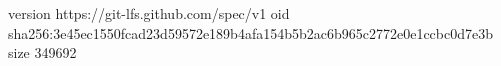 version https://git-lfs.github.com/spec/v1
oid sha256:3e45ec1550fcad23d59572e189b4afa154b5b2ac6b965c2772e0e1ccbc0d7e3b
size 349692
